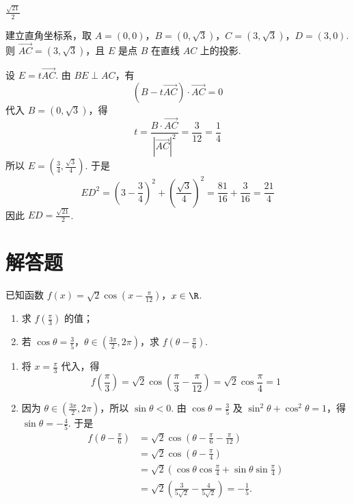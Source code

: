 \begin{answer}
\(\frac{\sqrt{21}}{2}\)
\end{answer}

\begin{solution}
建立直角坐标系，取 \(A=(0,0)\)，\(B=(0,\sqrt3)\)，\(C=(3,\sqrt3)\)，\(D=(3,0)\). 则 \(\overrightarrow{AC}=(3,\sqrt3)\)，且 \(E\) 是点 \(B\) 在直线 \(AC\) 上的投影.

设 \(E=t\overrightarrow{AC}\). 由 \(BE\perp AC\)，有
\[
\left(B-t\overrightarrow{AC}\right)\cdot\overrightarrow{AC}=0
\]
代入 \(B=(0,\sqrt3)\)，得
\[
t=\frac{B\cdot\overrightarrow{AC}}{|\overrightarrow{AC}|^2}=\frac{3}{12}=\frac14
\]
所以 \(E=\left(\frac34,\frac{\sqrt3}{4}\right)\). 于是
\[
ED^2=\left(3-\frac34\right)^2+\left(\frac{\sqrt3}{4}\right)^2=\frac{81}{16}+\frac3{16}=\frac{21}{4}
\]
因此 \(ED=\frac{\sqrt{21}}2\).
\end{solution}

\section{解答题}

\begin{problem}
已知函数 \(f(x) = \sqrt{2}\cos \left(x - \frac{\pi}{12}\right)\)，\(x \in \R\).
\begin{enumerate}
\item 求 \( f\left(\frac{\pi}{3}\right) \) 的值；
\item 若 \(\cos\theta=\frac{3}{5}\)，\(\theta\in\left(\frac{3\pi}{2},2\pi\right)\)，求 \( f\left(\theta-\frac{\pi}{6}\right) \).
\end{enumerate}
\end{problem}

\begin{solution}
\begin{enumerate}
\item
将 \(x=\frac{\pi}{3}\) 代入，得
\[
f\left(\frac{\pi}{3}\right)=\sqrt2\cos\left(\frac{\pi}{3}-\frac{\pi}{12}\right)=\sqrt2\cos\frac{\pi}{4}=1
\]

\item
因为 \(\theta\in\left(\frac{3\pi}{2},2\pi\right)\)，所以 \(\sin\theta<0\). 由 \(\cos\theta=\frac35\) 及 \(\sin^2\theta+\cos^2\theta=1\)，得 \(\sin\theta=-\frac45\). 于是
\[
\begin{aligned}
f\left(\theta-\frac{\pi}{6}\right)
&=\sqrt2\cos\left(\theta-\frac{\pi}{6}-\frac{\pi}{12}\right)\\
&=\sqrt2\cos\left(\theta-\frac{\pi}{4}\right)\\
&=\sqrt2\left(\cos\theta\cos\frac{\pi}{4}+\sin\theta\sin\frac{\pi}{4}\right)\\
&=\sqrt2\left(\frac{3}{5\sqrt2}-\frac{4}{5\sqrt2}\right)=-\frac15.
\end{aligned}
\]
\end{enumerate}
\end{solution}

